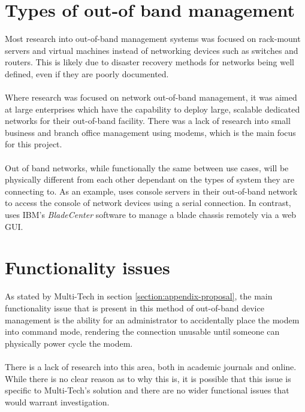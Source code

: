 \section{Types of out-of band management}
\label{section:lit-types}
Most research into out-of-band management systems was focused on rack-mount servers and virtual machines instead of networking devices such as switches and routers. This is likely due to disaster recovery methods for networks being well defined, even if they are poorly documented. \\\\
Where research was focused on network out-of-band management, it was aimed at large enterprises which have the capability to deploy large, scalable dedicated networks for their out-of-band facility. There was a lack of research into small business and branch office management using modems, which is the main focus for this project. \\\\
Out of band networks, while functionally the same between use cases, will be physically different from each other dependant on the types of system they are connecting to. As an example, \cite{cisco-ha} uses console servers in their out-of-band network to access the console of network devices using a serial connection. In contrast, \cite{pruett_bladecenter_2005} uses IBM's \textit{BladeCenter} software to manage a blade chassis remotely via a web GUI. 

\section{Functionality issues}
\label{section:lit-functionality}
As stated by Multi-Tech in section \ref{section:appendix-proposal}, the main functionality issue that is present in this method of out-of-band device management is the ability for an administrator to accidentally place the modem into command mode, rendering the connection unusable until someone can physically power cycle the modem. \\\\
There is a lack of research into this area, both in academic journals and online. While there is no clear reason as to why this is, it is possible that this issue is specific to Multi-Tech's solution and there are no wider functional issues that would warrant investigation.


